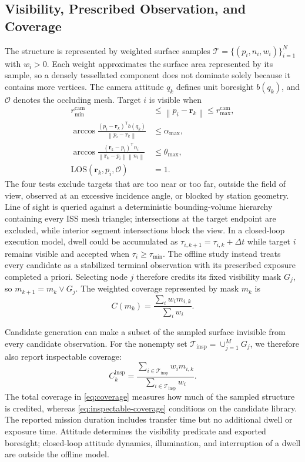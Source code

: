 \documentclass{IEEEtaes}
\newcommand{\dt}{\Delta t}
\newcommand{\norm}[1]{\left\lVert #1 \right\rVert}
\newcommand{\los}{\mathrm{LOS}}
\theoremstyle{remark}
\theoremstyle{plain}
\begin{document}
\subsection{Visibility, Prescribed Observation, and Coverage}

The structure is represented by weighted surface samples $\mathcal T=\{(p_i,n_i,w_i)\}_{i=1}^{N}$ with $w_i>0$. Each weight approximates the surface area represented by its sample, so a densely tessellated component does not dominate solely because it contains more vertices. The camera attitude $q_k$ defines unit boresight $b(q_k)$, and $\mathcal O$ denotes the occluding mesh. Target $i$ is visible when
\begin{align}
  r_{\min}^{\mathrm{cam}}&\le\norm{p_i-\mathbf r_k}\le r_{\max}^{\mathrm{cam}},\nonumber\\
  \arccos\!\frac{(p_i-\mathbf r_k)^{\mathsf T}b(q_k)}
  {\norm{p_i-\mathbf r_k}}&\le\alpha_{\max},\nonumber\\
  \arccos\!\frac{(\mathbf r_k-p_i)^{\mathsf T}n_i}
  {\norm{\mathbf r_k-p_i}\norm{n_i}}&\le\theta_{\max},\nonumber\\
  \los(\mathbf r_k,p_i,\mathcal O)&=1.
  \label{eq:visibility}
\end{align}
The four tests exclude targets that are too near or too far, outside the field of view, observed at an excessive incidence angle, or blocked by station geometry. Line of sight is queried against a deterministic bounding-volume hierarchy containing every ISS mesh triangle; intersections at the target endpoint are excluded, while interior segment intersections block the view. In a closed-loop execution model, dwell could be accumulated as $\tau_{i,k+1}=\tau_{i,k}+\dt$ while target $i$ remains visible and accepted when $\tau_i\ge\tau_{\min}$. The offline study instead treats every candidate as a stabilized terminal observation with its prescribed exposure completed a priori. Selecting node $j$ therefore credits its fixed visibility mask $G_j$, so $m_{k+1}=m_k\lor G_j$. The weighted coverage represented by mask $m_k$ is
\begin{equation}
  C(m_k)=\frac{\sum_i w_i m_{i,k}}{\sum_i w_i}.
  \label{eq:coverage}
\end{equation}

Candidate generation can make a subset of the sampled surface invisible from every candidate observation. For the nonempty set $\mathcal T_{\mathrm{insp}}=\cup_{j=1}^{M}G_j$, we therefore also report inspectable coverage:
\begin{equation}
  C_k^{\mathrm{insp}}=
  \frac{\sum_{i\in\mathcal T_{\mathrm{insp}}}w_i m_{i,k}}
  {\sum_{i\in\mathcal T_{\mathrm{insp}}}w_i}.
  \label{eq:inspectable-coverage}
\end{equation}
The total coverage in \eqref{eq:coverage} measures how much of the sampled structure is credited, whereas \eqref{eq:inspectable-coverage} conditions on the candidate library. The reported mission duration includes transfer time but no additional dwell or exposure time. Attitude determines the visibility predicate and exported boresight; closed-loop attitude dynamics, illumination, and interruption of a dwell are outside the offline model.
\end{document}
